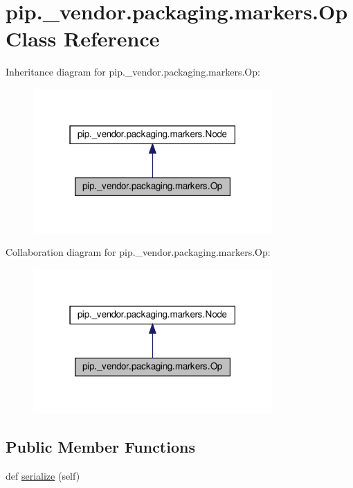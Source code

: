 \hypertarget{classpip_1_1__vendor_1_1packaging_1_1markers_1_1Op}{}\section{pip.\+\_\+vendor.\+packaging.\+markers.\+Op Class Reference}
\label{classpip_1_1__vendor_1_1packaging_1_1markers_1_1Op}


Inheritance diagram for pip.\+\_\+vendor.\+packaging.\+markers.\+Op\+:
\nopagebreak
\begin{figure}[H]
\begin{center}
\leavevmode
\includegraphics[width=259pt]{classpip_1_1__vendor_1_1packaging_1_1markers_1_1Op__inherit__graph}
\end{center}
\end{figure}


Collaboration diagram for pip.\+\_\+vendor.\+packaging.\+markers.\+Op\+:
\nopagebreak
\begin{figure}[H]
\begin{center}
\leavevmode
\includegraphics[width=259pt]{classpip_1_1__vendor_1_1packaging_1_1markers_1_1Op__coll__graph}
\end{center}
\end{figure}
\subsection*{Public Member Functions}
\begin{DoxyCompactItemize}
\item 
def \hyperlink{classpip_1_1__vendor_1_1packaging_1_1markers_1_1Op_a608f07b1c1a4f75ff238ac4c490e35e8}{serialize} (self)
\end{DoxyCompactItemize}
